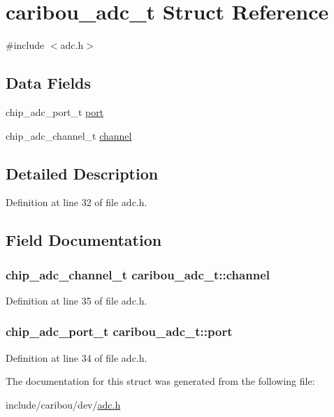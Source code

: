 \hypertarget{structcaribou__adc__t}{\section{caribou\-\_\-adc\-\_\-t Struct Reference}
\label{structcaribou__adc__t}
}


{\ttfamily \#include $<$adc.\-h$>$}

\subsection*{Data Fields}
\begin{DoxyCompactItemize}
\item 
chip\-\_\-adc\-\_\-port\-\_\-t \hyperlink{structcaribou__adc__t_a81d68d4d24e7fd693a001d92a96a2e52}{port}
\item 
chip\-\_\-adc\-\_\-channel\-\_\-t \hyperlink{structcaribou__adc__t_ad7e1d6b340173ec1b982221bfd888a4c}{channel}
\end{DoxyCompactItemize}


\subsection{Detailed Description}


Definition at line 32 of file adc.\-h.



\subsection{Field Documentation}
\hypertarget{structcaribou__adc__t_ad7e1d6b340173ec1b982221bfd888a4c}{
\subsubsection[{channel}]{\setlength{\rightskip}{0pt plus 5cm}chip\-\_\-adc\-\_\-channel\-\_\-t caribou\-\_\-adc\-\_\-t\-::channel}}\label{structcaribou__adc__t_ad7e1d6b340173ec1b982221bfd888a4c}


Definition at line 35 of file adc.\-h.

\hypertarget{structcaribou__adc__t_a81d68d4d24e7fd693a001d92a96a2e52}{
\subsubsection[{port}]{\setlength{\rightskip}{0pt plus 5cm}chip\-\_\-adc\-\_\-port\-\_\-t caribou\-\_\-adc\-\_\-t\-::port}}\label{structcaribou__adc__t_a81d68d4d24e7fd693a001d92a96a2e52}


Definition at line 34 of file adc.\-h.



The documentation for this struct was generated from the following file\-:\begin{DoxyCompactItemize}
\item 
include/caribou/dev/\hyperlink{adc_8h}{adc.\-h}\end{DoxyCompactItemize}
